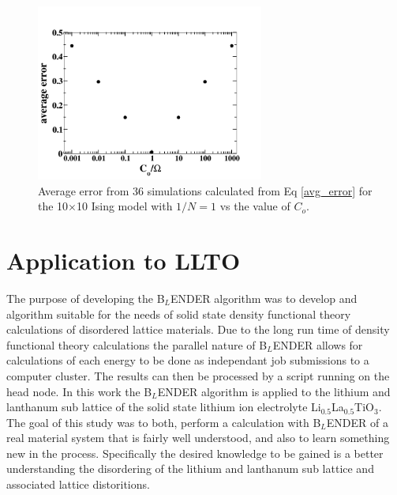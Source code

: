 \documentclass[aps,prl,reprint,superscriptaddress,showkeys]{revtex4-1}
\begin{document}
\begin{figure}[h!]
\includegraphics[width=7.5cm]{./figures/optimalCo.png}
\caption{Average error from 36 simulations calculated from Eq \ref{avg_error} for the 10$\times$10 Ising model with $1/N=1$ vs the value of $C_{o}$.  \label{optimalCo}}
\end{figure}





\section{Application to LLTO}
The purpose of developing the B$_L$ENDER algorithm was to develop and algorithm suitable for the needs of solid state density functional theory calculations of disordered lattice materials.  Due to the long run time of density functional theory calculations  the parallel nature of B$_L$ENDER allows for calculations of each energy to be done as independant job submissions to a computer cluster. The results can then be processed by a script running on the head node.  In this work the B$_L$ENDER algorithm is applied to the lithium and lanthanum sub lattice of the solid state lithium ion electrolyte  Li$_{0.5}$La$_{0.5}$TiO$_{3}$. The goal of this study was to both, perform a calculation with B$_L$ENDER of a real material system that is fairly well understood, and also to learn something new in the process.  Specifically the desired knowledge to be gained is a better understanding the disordering of the lithium and lanthanum sub lattice and associated lattice distoritions. 
\end{document}
